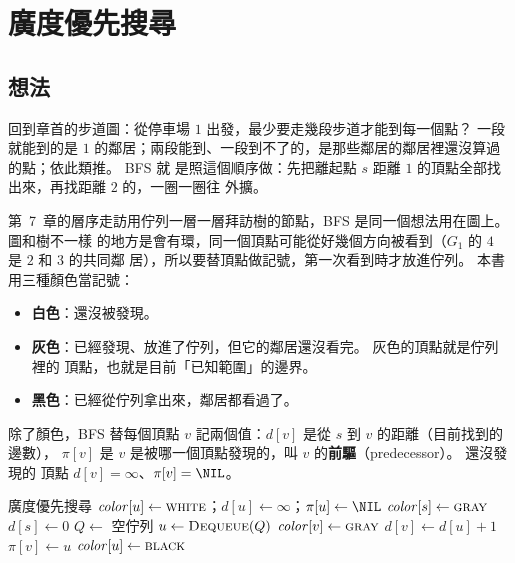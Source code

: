 \section{廣度優先搜尋}
\label{sec:gtr-bfs}

\subsection{想法}

回到章首的步道圖：從停車場 $1$ 出發，最少要走幾段步道才能到每一個點？ 一段就能到的是
$1$ 的鄰居；兩段能到、一段到不了的，是那些鄰居的鄰居裡還沒算過的點；依此類推。 BFS 就
是照這個順序做：先把離起點 $s$ 距離 $1$ 的頂點全部找出來，再找距離 $2$ 的，一圈一圈往
外擴。

第~7~章的層序走訪用佇列一層一層拜訪樹的節點，BFS 是同一個想法用在圖上。 圖和樹不一樣
的地方是會有環，同一個頂點可能從好幾個方向被看到（$G_1$ 的 $4$ 是 $2$ 和 $3$ 的共同鄰
居），所以要替頂點做記號，第一次看到時才放進佇列。 本書用三種顏色當記號：

\begin{itemize}
\item \textbf{白色}：還沒被發現。
\item \textbf{灰色}：已經發現、放進了佇列，但它的鄰居還沒看完。 灰色的頂點就是佇列裡的
頂點，也就是目前「已知範圍」的邊界。
\item \textbf{黑色}：已經從佇列拿出來，鄰居都看過了。
\end{itemize}

除了顏色，BFS 替每個頂點 $v$ 記兩個值：$d[v]$ 是從 $s$ 到 $v$ 的距離（目前找到的邊數），
$\pi[v]$ 是 $v$ 是被哪一個頂點發現的，叫 $v$ 的\textbf{前驅}（predecessor）。 還沒發現的
頂點 $d[v] = \infty$、$\pi[v] = \NIL$。

\begin{pseudo}[label=alg:gtr-bfs]{廣度優先搜尋}
        \State $\mathit{color}[u] \gets \textsc{white}$；$d[u] \gets \infty$；$\pi[u] \gets \NIL$
    \EndFor
    \State $\mathit{color}[s] \gets \textsc{gray}$
    \State $d[s] \gets 0$
    \State $Q \gets$ 空佇列
    \State {}
        \State $u \gets \Call{Dequeue}{Q}$
         
                \State $\mathit{color}[v] \gets \textsc{gray}$
                \State $d[v] \gets d[u] + 1$
                \State $\pi[v] \gets u$
                \State {}
            \EndIf
        \EndFor
        \State $\mathit{color}[u] \gets \textsc{black}$
    \EndWhile
\EndProcedure
\end{pseudo}

